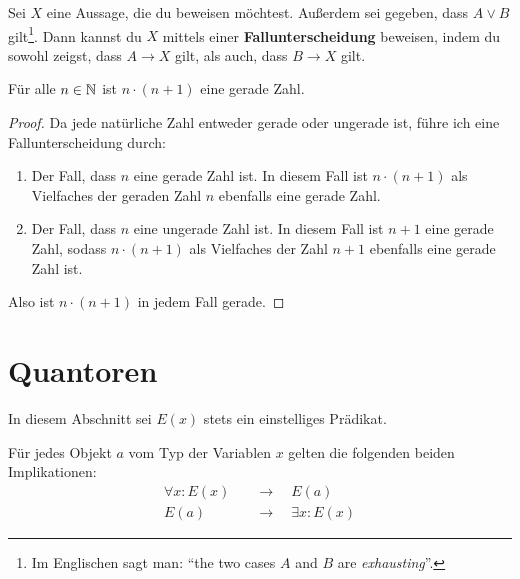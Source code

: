 \begin{axiom} \label{fallunterscheidung} 
    Sei $X$ eine Aussage, die du beweisen möchtest. Außerdem sei gegeben, dass $A\lor B$ gilt\footnote{Im Englischen sagt man: ``the two cases $A$ and $B$ are \emph{exhausting}''.}. Dann kannst du $X$ mittels einer \textbf{Fallunterscheidung} beweisen, indem du sowohl zeigst, dass $A\to X$ gilt, als auch, dass $B\to X$ gilt.
\end{axiom}


\begin{bsp} \label{bsp:fallunterscheidung}
    Für alle $n\in \mathbb N$ ist $n\cdot (n+1)$ eine gerade Zahl.
\end{bsp}
\begin{proof}
    Da jede natürliche Zahl entweder gerade oder ungerade ist, führe ich eine Fallunterscheidung durch:
    \begin{enumerate}[1)]
        \item Der Fall, dass $n$ eine gerade Zahl ist. In diesem Fall ist $n\cdot (n+1)$ als Vielfaches der geraden Zahl $n$ ebenfalls eine gerade Zahl.
        \item Der Fall, dass $n$ eine ungerade Zahl ist. In diesem Fall ist $n+1$ eine gerade Zahl, sodass $n\cdot (n+1)$ als Vielfaches der Zahl $n+1$ ebenfalls eine gerade Zahl ist.
    \end{enumerate}
    Also ist $n\cdot(n+1)$ in jedem Fall gerade.
\end{proof}





\section{Quantoren}


In diesem Abschnitt sei $E(x)$ stets ein einstelliges Prädikat.


\begin{axiom}[*] \label{quantorenaxiom}
    Für jedes Objekt $a$ vom Typ der Variablen $x$ gelten die folgenden beiden Implikationen:
    \begin{align*}
         \forall x: E(x) \quad& \to\quad E(a) \\
         E(a) \quad & \to\quad \exists x: E(x)
    \end{align*}
\end{axiom}

